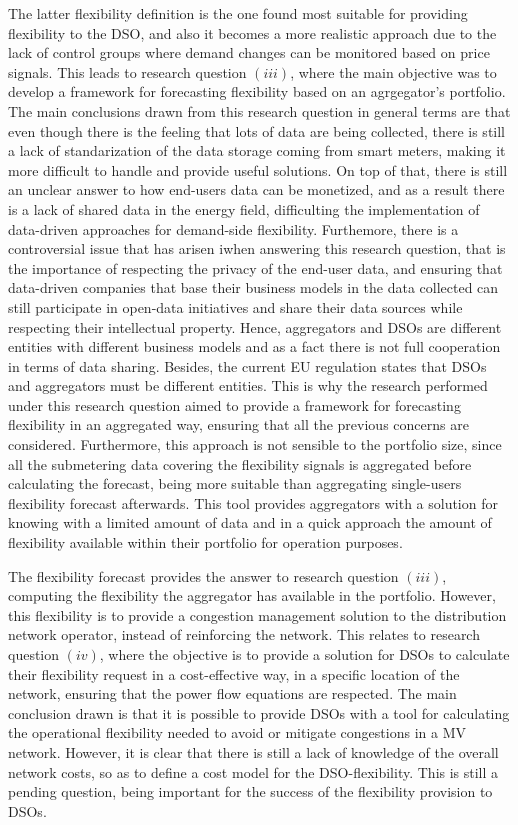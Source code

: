 The latter flexibility definition is the one found most suitable for providing flexibility to the DSO, and also it becomes a more realistic approach due to the lack of control groups where demand changes can be monitored based on price signals. This leads to research question $(iii)$, where the main objective was to develop a framework for forecasting flexibility based on an agrgegator's portfolio. The main conclusions drawn from this research question in general terms are that even though there is the feeling that lots of data are being collected, there is still a lack of standarization of the data storage coming from smart meters, making it more difficult to handle and provide useful solutions. On top of that, there is still an unclear answer to how end-users data can be monetized, and as a result there is a lack of shared data in the energy field, difficulting the implementation of data-driven approaches for demand-side flexibility. Furthemore, there is a controversial issue that has arisen iwhen answering this research question, that is the importance of respecting the privacy of the end-user data, and ensuring that data-driven companies that base their business models in the data collected can still participate in open-data initiatives and share their data sources while respecting their intellectual property. Hence, aggregators and DSOs are different entities with different business models and as a fact there is not full cooperation in terms of data sharing. Besides, the current EU regulation states that DSOs and aggregators must be different entities. This is why the research performed under this research question aimed to provide a framework for forecasting flexibility in an aggregated way, ensuring that all the previous concerns are considered. Furthermore, this approach is not sensible to the portfolio size, since all the submetering data covering the flexibility signals is aggregated before calculating the forecast, being more suitable than aggregating single-users flexibility forecast afterwards. This tool provides aggregators with a solution for knowing with a limited amount of data and in a quick approach the amount of flexibility available within their portfolio for operation purposes. 

The flexibility forecast provides the answer to research question $(iii)$, computing the flexibility the aggregator has available in the portfolio. However, this flexibility is to provide a congestion management solution to the distribution network operator, instead of reinforcing the network. This relates to research question $(iv)$, where the objective is to provide a solution for DSOs to calculate their flexibility request in a cost-effective way, in a specific location of the network, ensuring that the power flow equations are respected. The main conclusion drawn is that it is possible to provide DSOs with a tool for calculating the operational flexibility needed to avoid or mitigate congestions in a MV network. However, it is clear that there is still a lack of knowledge of the overall network costs, so as to define a cost model for the DSO-flexibility. This is still a pending question, being important for the success of the flexibility provision to DSOs. 

